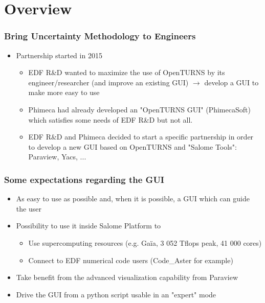 \documentclass[aspectratio=169]{beamer}
\begin{document}
\section{Overview}

\begin{frame}
  \frametitle{Bring Uncertainty Methodology to Engineers}
  \begin{itemize}
  \item Partnership started in 2015

    \begin{itemize}
    \item EDF R\&D wanted to maximize the use of OpenTURNS\textregistered{} by its engineer/researcher (and improve an existing GUI) $\rightarrow$ develop a GUI to make more easy to use

    \item Phimeca had already developed an "OpenTURNS GUI" (PhimecaSoft\textregistered{}) which satisfies some needs of EDF R\&D but not all.

    \item EDF R\&D and Phimeca decided to start a specific partnership in order to develop a new GUI based on OpenTURNS\textregistered{} and "Salome Tools": Paraview, Yacs, ...
    \end{itemize}
  \end{itemize}
\end{frame}


\begin{frame}
  \frametitle{Some expectations regarding the GUI}
  \begin{itemize}
  \item As easy to use as possible and, when it is possible, a GUI which can guide the user

  \item Possibility to use it inside Salome Platform to
    \begin{itemize}
    \item Use supercomputing resources (e.g. Gaïa, 3 052 Tflops peak, 41 000 cores)
    \item Connect to EDF numerical code users (Code\_Aster for example)
    \end{itemize}

  \item Take benefit from the advanced visualization capability from Paraview

  \item Drive the GUI from a python script usable in an "expert" mode
  \end{itemize}
\end{frame}
\end{document}
